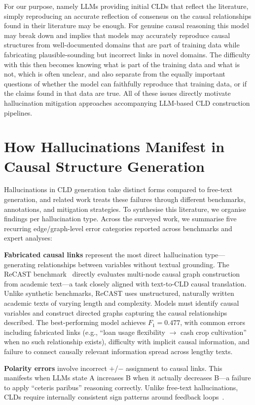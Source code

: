 For our purpose, namely LLMs providing initial CLDs that reflect the literature, simply reproducing an accurate reflection of consensus on the causal relationships found in their literature may be enough. For genuine causal reasoning this model may break down and implies that models may accurately reproduce causal structures from well-documented domains that are part of training data while fabricating plausible-sounding but incorrect links in novel domains. The difficulty with this then becomes knowing what is part of the training data and what is not, which is often unclear, and also separate from the equally important questions of whether the model can faithfully reproduce that training data, or if the claims found in that data are true. All of these issues directly motivate hallucination mitigation approaches accompanying LLM-based CLD construction pipelines.

\section{How Hallucinations Manifest in Causal Structure Generation}

Hallucinations in CLD generation take distinct forms compared to free-text generation, and related work treats these failures through different benchmarks, annotations, and mitigation strategies. To synthesise this literature, we organise findings per hallucination type. Across the surveyed work, we summarise five recurring edge/graph-level error categories reported across benchmarks and expert analyses:

\textbf{Fabricated causal links} represent the most direct hallucination type---generating relationships between variables without textual grounding. The ReCAST benchmark~\citep{recast2025} directly evaluates multi-node causal graph construction from academic text---a task closely aligned with text-to-CLD causal translation. Unlike synthetic benchmarks, ReCAST uses unstructured, naturally written academic texts of varying length and complexity. Models must identify causal variables and construct directed graphs capturing the causal relationships described. The best-performing model achieves $F_1 = 0.477$, with common errors including fabricated links (e.g., ``loan usage flexibility $\rightarrow$ cash crop cultivation'' when no such relationship exists), difficulty with implicit causal information, and failure to connect causally relevant information spread across lengthy texts.

\textbf{Polarity errors} involve incorrect $+$/$-$ assignment to causal links. This manifests when LLMs state A increases B when it actually decreases B---a failure to apply ``ceteris paribus'' reasoning correctly. Unlike free-text hallucinations, CLDs require internally consistent sign patterns around feedback loops~\citep{schoenberg2025aibuildsdmodels}.

